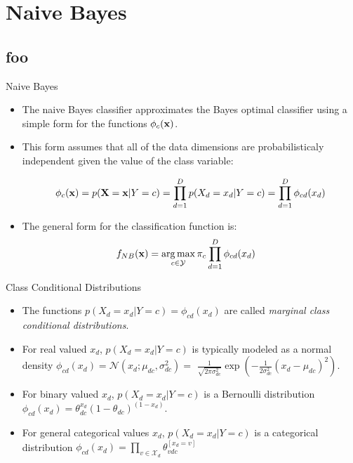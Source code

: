 \documentclass[serif,xcolor=pdftex,dvipsnames,table,hyperref={bookmarks=false}]{beamer}
\begin{document}
\section{Naive Bayes}
\subsection{foo}

\begin{frame}[t]{Naive Bayes}

\begin{itemize}
\item The naive Bayes classifier approximates the Bayes optimal classifier using a simple form for the functions $\phi_c({\mathbf{x}})$. 

\pause \item This form assumes that all of the data dimensions are probabilisticaly independent given the value of the class variable:

$$\phi_c({\mathbf{x}}) = p({\mathbf{X}}={\mathbf{x}}|Y=c) = \prod_{d=1}^D p(X_d=x_d|Y=c)=\prod_{d=1}^D \phi_{cd}(x_d)$$

\pause \item The general form for the classification function is:
%
{\Large
\begin{align*}
f_{NB}({\mathbf{x}})&=\operatorname*{arg\,max}_{c\in\mathcal{Y}} \pi_c\prod_{d=1}^D\phi_{cd}(x_d)
\end{align*}
}
\end{itemize}

\end{frame}


\begin{frame}[t]{Class Conditional Distributions}

\begin{itemize}\setlength{\itemsep}{12pt}
\item The functions $p(X_d=x_d|Y=c)=\phi_{cd}(x_d)$ are called \textit{marginal class conditional distributions}.

\pause \item For real valued $x_d$,  $p(X_d=x_d|Y=c)$ is typically modeled as a normal density $\phi_{cd}(x_d)=\mathcal{N}(x_d;\mu_{dc},\sigma^2_{dc})=$ $\frac{1}{\sqrt{2\pi\sigma_{dc}^2}}\exp\left(-\frac{1}{2\sigma_{dc}^2}(x_d-\mu_{dc})^2\right)$.

\pause \item For binary valued $x_d$,  $p(X_d=x_d|Y=c)$ is a Bernoulli distribution $\phi_{cd}(x_d)=\theta_{dc}^{x_d}(1-\theta_{dc})^{(1-x_d)}$.

\pause \item For general categorical values $x_d$,  $p(X_d=x_d|Y=c)$ is a categorical distribution $\phi_{cd}(x_d)=\prod_{v\in\mathcal{X}_d} \theta_{vdc}^{[x_d=v]}$

\end{itemize}

\end{frame}
\end{document}
